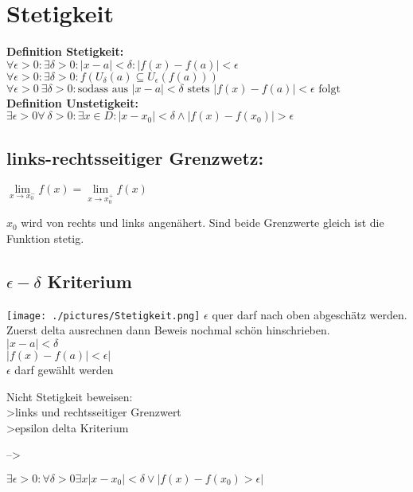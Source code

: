 \documentclass[final, 12pt]{article}
\begin{document}
\section{Stetigkeit}

\textbf{Definition Stetigkeit:}\\
$\forall \epsilon > 0 :\exists \delta > 0 : |x-a|<\delta : |f(x)-f(a)|<\epsilon$\\
$\forall \epsilon > 0 :\exists \delta > 0 : f(U_{\delta}(a) \subseteq U_{\epsilon}(f(a)))$\\
$\forall \epsilon > 0\  \exists \delta >0 : \text{sodass aus } |x-a|<\delta \text{ stets } |f(x)-f(a)|<\epsilon \text{ folgt}$\\

\textbf{Definition Unstetigkeit:} $\exists \epsilon > 0 \forall\  \delta > 0 :\exists x \in D : |x-x_0|< \delta \wedge |f(x)-f(x_0)|>\epsilon$

\subsection{links-rechtsseitiger Grenzwetz:}

$\lim\limits_{x\to x_0^-}f(x) = \lim\limits_{x\to x_0^+} f(x)$

$x_0$ wird von rechts und links angenähert. Sind beide Grenzwerte gleich ist die Funktion stetig.


\subsection{$\epsilon - \delta$ Kriterium}

\texttt{[image: ./pictures/Stetigkeit.png]}
$\epsilon$ quer darf nach oben abgeschätz werden.
Zuerst delta ausrechnen
dann Beweis nochmal schön hinschrieben.\\

$|x-a|<\delta$\\
$|f(x)-f(a)|< \epsilon|$\\

$\epsilon$ darf gewählt werden

Nicht Stetigkeit beweisen:\\
>links und rechtsseitiger Grenzwert\\
>epsilon delta Kriterium

-->

$\exists \epsilon > 0 :\forall \delta >0 \exists x |x-x_0| < \delta \vee |f(x)-f(x_0) > \epsilon|$



\newpage
\end{document}
